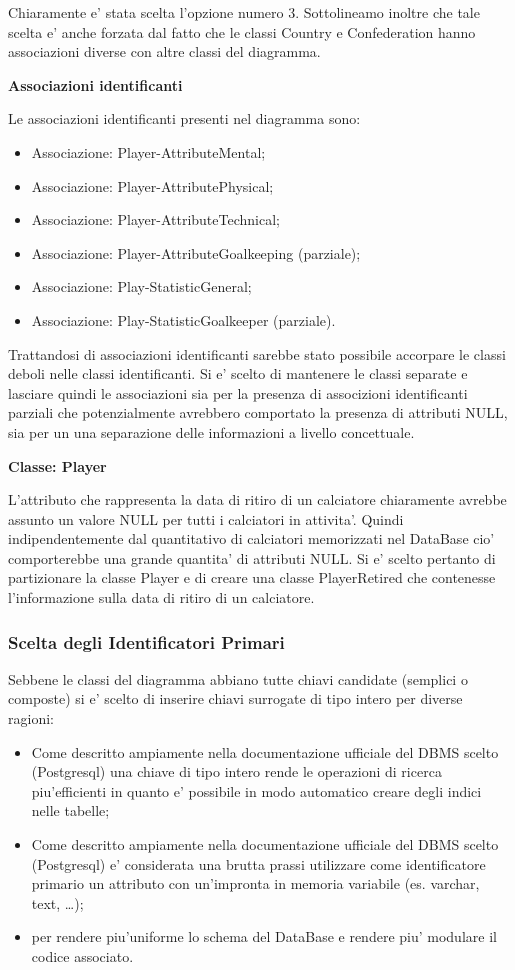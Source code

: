 Chiaramente e' stata scelta l'opzione numero 3.
Sottolineamo inoltre che tale scelta e' anche forzata dal fatto che le classi Country e Confederation
hanno associazioni diverse con altre classi del diagramma.

\textbf{Associazioni identificanti}

Le associazioni identificanti presenti nel diagramma sono:
\begin{itemize}
	\item Associazione: Player-AttributeMental;
	\item Associazione: Player-AttributePhysical;
	\item Associazione: Player-AttributeTechnical;
	\item Associazione: Player-AttributeGoalkeeping (parziale);
	\item Associazione: Play-StatisticGeneral;
	\item Associazione: Play-StatisticGoalkeeper (parziale).
\end{itemize}

Trattandosi di associazioni identificanti sarebbe stato possibile accorpare le classi deboli
nelle classi identificanti. Si e' scelto di mantenere le classi separate e lasciare quindi le
associazioni sia per la presenza di associzioni identificanti parziali che potenzialmente
avrebbero comportato la presenza di attributi NULL, sia per un una separazione delle informazioni
a livello concettuale.

\textbf{Classe: Player}

L'attributo che rappresenta la data di ritiro di un calciatore chiaramente avrebbe assunto un
valore NULL per tutti i calciatori in attivita'. Quindi indipendentemente dal quantitativo di
calciatori memorizzati nel DataBase cio' comporterebbe una grande quantita' di attributi NULL.
Si e' scelto pertanto di partizionare la classe Player e di creare una classe PlayerRetired
che contenesse l'informazione sulla data di ritiro di un calciatore.


\newpage
\bigskip
\subsubsection{Scelta degli Identificatori Primari}
\bigskip

Sebbene le classi del diagramma abbiano tutte chiavi candidate (semplici o composte) si e' scelto di
inserire chiavi surrogate di tipo intero per diverse ragioni:
\begin{itemize}
	\item Come descritto ampiamente nella documentazione ufficiale del DBMS scelto (Postgresql)
		una chiave di tipo intero rende le operazioni di ricerca piu'efficienti in quanto e' possibile
		in modo automatico creare degli indici nelle tabelle;
	\item Come descritto ampiamente nella documentazione ufficiale del DBMS scelto (Postgresql)
		e' considerata una brutta prassi utilizzare come identificatore primario un attributo con
		un'impronta in memoria variabile (es. varchar, text, \dots);
	\item per rendere piu'uniforme lo schema del DataBase e rendere piu' modulare il codice associato.
\end{itemize}

